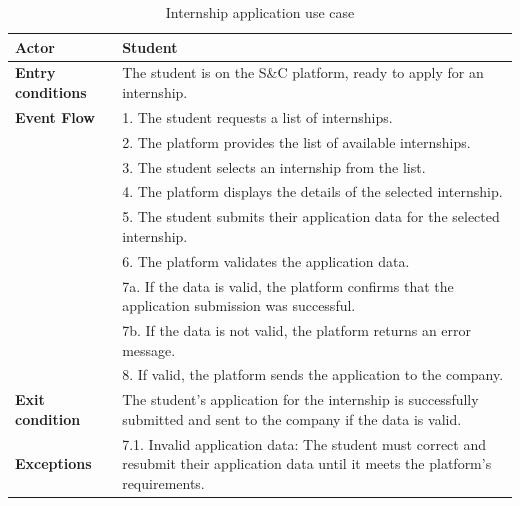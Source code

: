 \begin{table}[h!]
    \centering
    \begin{tabular}{lp{10cm}}
        \textbf{Actor} & Student \\ \hline
        \textbf{Entry conditions} & The student is on the S\&C platform, ready to apply for an internship. \\ \hline
        \textbf{Event Flow} & 
        1. The student requests a list of internships. \\
        & 2. The platform provides the list of available internships. \\
        & 3. The student selects an internship from the list. \\
        & 4. The platform displays the details of the selected internship. \\
        & 5. The student submits their application data for the selected internship. \\
        & 6. The platform validates the application data. \\
        & 7a. If the data is valid, the platform confirms that the application submission was successful. \\
        & 7b. If the data is not valid, the platform returns an error message. \\
        & 8. If valid, the platform sends the application to the company. \\
        \hline
        \textbf{Exit condition} & The student's application for the internship is successfully submitted and sent to the company if the data is valid. \\ \hline
        \textbf{Exceptions} & 
        7.1. Invalid application data: The student must correct and resubmit their application data until it meets the platform's requirements. \\
    \end{tabular}
    \caption{Internship application use case}
    \label{tab:internship_application}
\end{table}


